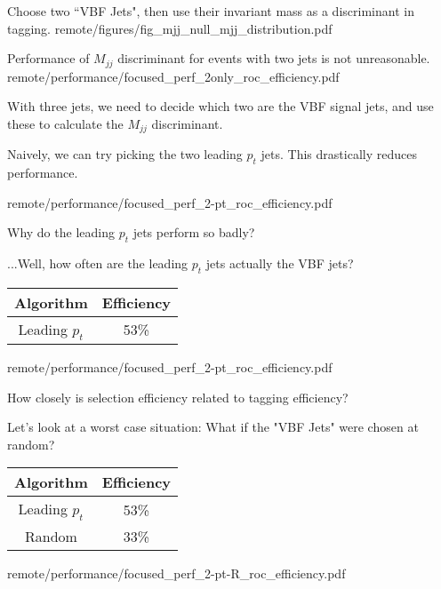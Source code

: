 
    { \footnotesize
        Choose two ``VBF Jets",
        then use their invariant mass
        as a discriminant in tagging.
    }
    {remote/figures/fig_mjj_null_mjj_distribution.pdf}


    {Performance of $M_{jj}$ discriminant for events with two jets is not unreasonable.}
    {remote/performance/focused_perf_2only_roc_efficiency.pdf}

    { \footnotesize
        With three jets, we need to decide which two are the VBF signal jets, and use these to calculate the $M_{jj}$ discriminant.

        \vspace{5mm}

        Naively, we can try picking the two leading $p_t$ jets. This drastically reduces performance.
    }
    {remote/performance/focused_perf_2-pt_roc_efficiency.pdf}

    { \footnotesize
        Why do the leading $p_t$ jets perform so badly?

        \vspace{5mm}

        ...Well, how often are the leading $p_t$ jets actually the VBF jets?

        \vspace{5mm}

        \begin{tabular}{|c|c|}\hline
        Algorithm & Efficiency \\
        \hline
        Leading $p_t$ & 53\% \\
        \hline
        \end{tabular}
    }
    {remote/performance/focused_perf_2-pt_roc_efficiency.pdf}

    { \footnotesize
        How closely is selection efficiency related to tagging efficiency?

        Let's look at a worst case situation:
        What if the "VBF Jets" were chosen at random?

        \vspace{5mm}

        \begin{tabular}{|c|c|}\hline
        Algorithm & Efficiency \\ \hline
        Leading $p_t$ & 53\% \\ \hline
        Random & 33\% \\ \hline
        \end{tabular}
    }
    {remote/performance/focused_perf_2-pt-R_roc_efficiency.pdf}


